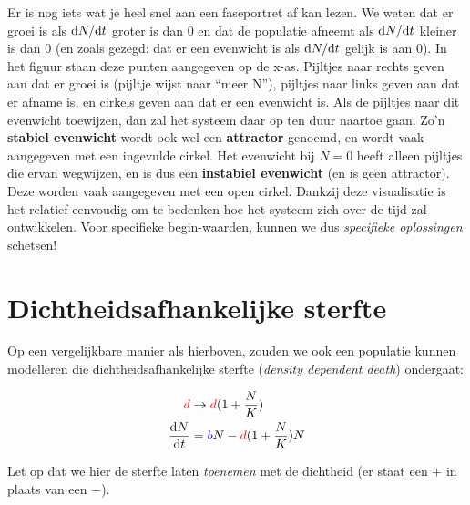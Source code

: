 \documentclass[
  a4paper,
]{scrbook}
\theoremstyle{definition}
\theoremstyle{remark}
\begin{document}
Er is nog iets wat je heel snel aan een faseportret af kan lezen. We
weten dat er groei is als \(\mathchoice{\frac{\mathrm{d}N}
{\mathrm{d}t}}{\mathrm{d}N/\mathrm{d}t}
{\mathrm{d}N/\mathrm{d}t}
{\mathrm{d}N/\mathrm{d}t}\) groter is dan \(0\) en dat de populatie
afneemt als \(\mathchoice{\frac{\mathrm{d}N}
{\mathrm{d}t}}{\mathrm{d}N/\mathrm{d}t}
{\mathrm{d}N/\mathrm{d}t}
{\mathrm{d}N/\mathrm{d}t}\) kleiner is dan \(0\) (en zoals gezegd: dat
er een evenwicht is als \(\mathchoice{\frac{\mathrm{d}N}
{\mathrm{d}t}}{\mathrm{d}N/\mathrm{d}t}
{\mathrm{d}N/\mathrm{d}t}
{\mathrm{d}N/\mathrm{d}t}\) gelijk is aan \(0\)). In het figuur staan
deze punten aangegeven op de x-as. Pijltjes naar rechts geven aan dat er
groei is (pijltje wijst naar ``meer N''), pijltjes naar links geven aan
dat er afname is, en cirkels geven aan dat er een evenwicht is. Als de
pijltjes naar dit evenwicht toewijzen, dan zal het systeem daar op ten
duur naartoe gaan. Zo'n \textbf{stabiel evenwicht} wordt ook wel een
\textbf{attractor} genoemd, en wordt vaak aangegeven met een ingevulde
cirkel. Het evenwicht bij \(N=0\) heeft alleen pijltjes die ervan
wegwijzen, en is dus een \textbf{instabiel evenwicht} (en is geen
attractor). Deze worden vaak aangegeven met een open cirkel. Dankzij
deze visualisatie is het relatief eenvoudig om te bedenken hoe het
systeem zich over de tijd zal ontwikkelen. Voor specifieke
begin-waarden, kunnen we dus \emph{specifieke oplossingen} schetsen!

\section{Dichtheidsafhankelijke
sterfte}\label{dichtheidsafhankelijke-sterfte}

Op een vergelijkbare manier als hierboven, zouden we ook een populatie
kunnen modelleren die dichtheidsafhankelijke sterfte (\emph{density
dependent death}) ondergaat:

\begin{align}
    \color{red}d\color{black} & \rightarrow \color{red}d\color{black}(1+\frac{N}{K}) \\
    \frac{\mathrm{d}N}{\mathrm{d}t} &= \color{blue}b\color{black}N - \color{red}d\color{black}(1+\frac{N}{K})N
\end{align}

Let op dat we hier de sterfte laten \emph{toenemen} met de dichtheid (er
staat een \(+\) in plaats van een \(-\)).
\end{document}
